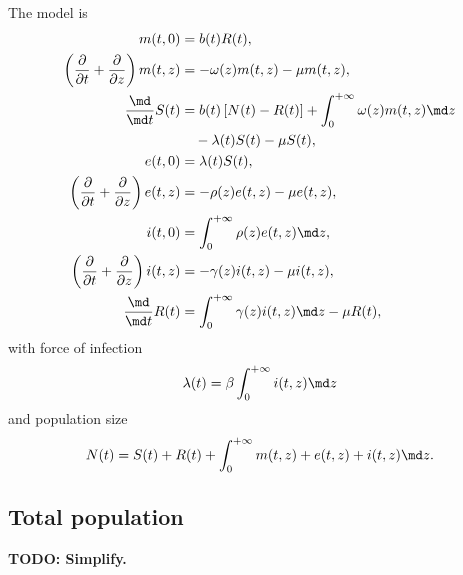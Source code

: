 \documentclass{jpmarticle}
\begin{document}
The model is
\begin{equation}
  \label{model_time_since_entry_structured}
  \begin{split}
    m(t, 0) &=
    b(t) R(t),
    \\
    \left(\frac{\partial}{\partial t}
      + \frac{\partial}{\partial z}\right)
    m(t, z) &=
    - \omega(z) m(t, z) - \mu m(t, z),
    \\
    \frac{\md}{\md t} S(t) &=
    b(t) \left[N(t) - R(t)\right]
    + \int_0^{+\infty} \omega(z) m(t, z) \md z
    \\ & \quad {}
    - \lambda(t) S(t) - \mu S(t),
    \\
    e(t, 0) &=
    \lambda(t) S(t),
    \\
    \left(\frac{\partial}{\partial t}
      + \frac{\partial}{\partial z}\right)
    e(t, z) &=
    - \rho(z) e(t, z) - \mu e(t, z),
    \\
    i(t, 0) &=
    \int_0^{+\infty} \rho(z) e(t, z) \md z,
    \\
    \left(\frac{\partial}{\partial t}
      + \frac{\partial}{\partial z}\right)
    i(t, z) &=
    - \gamma(z) i(t, z) - \mu i(t, z),
    \\
    \frac{\md}{\md t} R(t) &=
    \int_0^{+\infty} \gamma(z) i(t, z) \md z
    - \mu R(t),
  \end{split}
\end{equation}
with force of infection
\begin{equation}
  \lambda(t) = \beta \int_0^{+\infty} i(t, z) \md z
\end{equation}
and population size
\begin{equation}
  N(t) =
  S(t) + R(t)
  + \int_0^{+\infty} m(t, z) + e(t, z) + i(t, z) \md z.
\end{equation}


\subsection{Total population}

\textbf{TODO: Simplify.}
\end{document}
